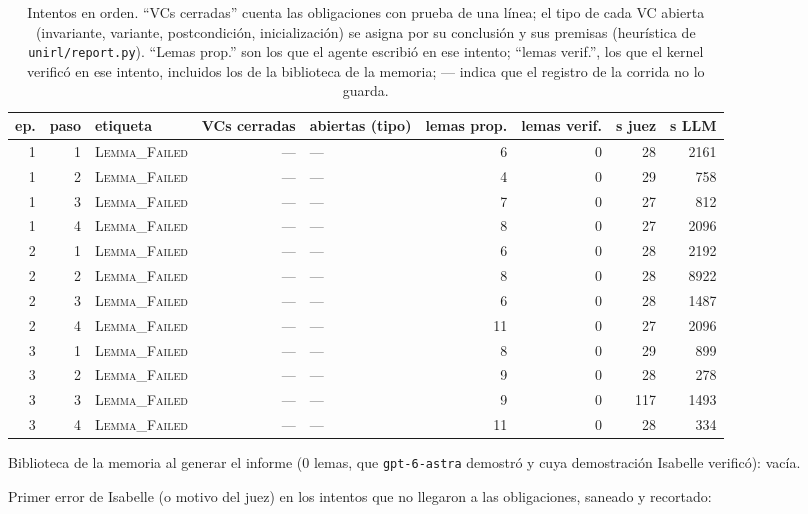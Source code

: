 \documentclass[11pt,a4paper]{article}
\begin{document}
\begin{table}[!ht]
\centering
\footnotesize
\setlength{\tabcolsep}{4pt}
\begin{tabular}{@{}rrlrlrrrr@{}}
\toprule
ep. & paso & etiqueta & VCs cerradas & abiertas (tipo) & lemas prop. & lemas verif. & s juez & s LLM \\
\midrule
1 & 1 & \textsc{Lemma\_Failed} & --- & --- & 6 & 0 & 28 & 2161 \\
1 & 2 & \textsc{Lemma\_Failed} & --- & --- & 4 & 0 & 29 & 758 \\
1 & 3 & \textsc{Lemma\_Failed} & --- & --- & 7 & 0 & 27 & 812 \\
1 & 4 & \textsc{Lemma\_Failed} & --- & --- & 8 & 0 & 27 & 2096 \\
2 & 1 & \textsc{Lemma\_Failed} & --- & --- & 6 & 0 & 28 & 2192 \\
2 & 2 & \textsc{Lemma\_Failed} & --- & --- & 8 & 0 & 28 & 8922 \\
2 & 3 & \textsc{Lemma\_Failed} & --- & --- & 6 & 0 & 28 & 1487 \\
2 & 4 & \textsc{Lemma\_Failed} & --- & --- & 11 & 0 & 27 & 2096 \\
3 & 1 & \textsc{Lemma\_Failed} & --- & --- & 8 & 0 & 29 & 899 \\
3 & 2 & \textsc{Lemma\_Failed} & --- & --- & 9 & 0 & 28 & 278 \\
3 & 3 & \textsc{Lemma\_Failed} & --- & --- & 9 & 0 & 117 & 1493 \\
3 & 4 & \textsc{Lemma\_Failed} & --- & --- & 11 & 0 & 28 & 334 \\
\bottomrule
\end{tabular}
\caption{Intentos en orden. ``VCs cerradas'' cuenta las obligaciones con prueba de una línea; el tipo de cada VC abierta (invariante, variante, postcondición, inicialización) se asigna por su conclusión y sus premisas (heurística de \texttt{unirl/report.py}). ``Lemas prop.'' son los que el agente escribió en ese intento; ``lemas verif.'', los que el kernel verificó en ese intento, incluidos los de la biblioteca de la memoria; --- indica que el registro de la corrida no lo guarda.}
\label{tab:intentos-bisection_isabelle_lemas_mem-0}
\end{table}

Biblioteca de la memoria al generar el informe (0 lemas, que \texttt{gpt-\allowbreak{}6-\allowbreak{}astra} demostró y cuya demostración Isabelle verificó): vacía.

Primer error de Isabelle (o motivo del juez) en los intentos que no llegaron a las obligaciones, saneado y recortado:
\end{document}
